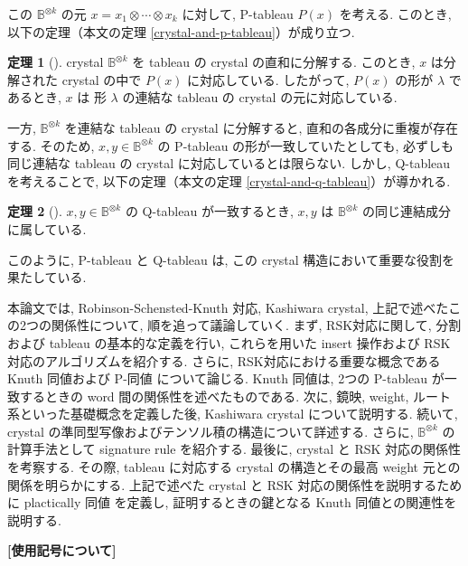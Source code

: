 \documentclass[
  a4paper, 
  12pt,
  ja=standard,
  xelatex,
  left=30truemm,
  right=30truemm,
  titlepage 
]{bxjsarticle}
\theoremstyle{definition}
\newtheorem{thm}{定理}[section]
\begin{document}
この $\mathbb{B}^{\otimes k}$ の元 $x = x_1 \otimes \cdots \otimes x_k$ に対して, P-tableau $P(x)$ を考える.  
このとき, 以下の定理（本文の定理 \ref{crystal-and-p-tableau}）が成り立つ.

\begin{thm}[{\cite[定理8.6]{b2}}]
  crystal $\mathbb{B}^{\otimes k}$ を tableau の crystal の直和に分解する.
  このとき, $x$ は分解された crystal の中で $P(x)$ に対応している.  
  したがって, $P(x)$ の形が $\lambda$ であるとき, $x$ は 形 $\lambda$ の連結な tableau の crystal の元に対応している.
\end{thm}

一方, $\mathbb{B}^{\otimes k}$ を連結な tableau の crystal に分解すると, 直和の各成分に重複が存在する.  
そのため, $x, y \in \mathbb{B}^{\otimes k}$ の P-tableau の形が一致していたとしても, 必ずしも同じ連結な tableau の crystal に対応しているとは限らない.  
しかし, Q-tableau を考えることで, 以下の定理（本文の定理 \ref{crystal-and-q-tableau}）が導かれる.

\begin{thm}[{\cite[定理8.7]{b2}}]
  $x, y \in \mathbb{B}^{\otimes k}$ の Q-tableau が一致するとき, 
  $x, y$ は $\mathbb{B}^{\otimes k}$ の同じ連結成分に属している.
\end{thm}

このように, P-tableau と Q-tableau は, この crystal 構造において重要な役割を果たしている.

本論文では, Robinson-Schensted-Knuth 対応, Kashiwara crystal, 上記で述べたこの2つの関係性について,
順を追って議論していく.
まず, RSK対応に関して, 分割および tableau の基本的な定義を行い, 
これらを用いた insert 操作および RSK 対応のアルゴリズムを紹介する.
さらに, RSK対応における重要な概念である Knuth 同値および P-同値 について論じる.
Knuth 同値は, 2つの P-tableau が一致するときの word 間の関係性を述べたものである.
次に, 鏡映, weight, ルート系といった基礎概念を定義した後, 
Kashiwara crystal について説明する.
続いて, crystal の準同型写像およびテンソル積の構造について詳述する. 
さらに,  $\mathbb{B}^{\otimes k}$ の計算手法として signature rule を紹介する.
最後に, crystal と RSK 対応の関係性を考察する. 
その際, tableau に対応する crystal の構造とその最高 weight 元との関係を明らかにする.
上記で述べた crystal と RSK 対応の関係性を説明するために
plactically 同値 を定義し, 証明するときの鍵となる Knuth 同値との関連性を説明する.

\begin{center} \textbf{[使用記号について]} \end{center}
\end{document}
